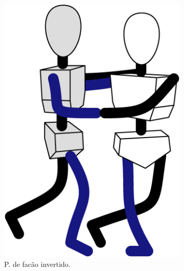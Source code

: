 \begin{figure}[!ht]
\begin{subfigure}[b]{0.245\textwidth}
         \includegraphics[width=\textwidth]{chapters/cap-normas/position-facao-invertido.eps}
         \caption{P. de facão invertido.}
         \label{fig:positiongeralsamba:facaoinvertido}
     \end{subfigure}
     \hfill
     \begin{subfigure}[b]{0.295\textwidth}
         \centering

\end{subfigure}
\end{figure}
